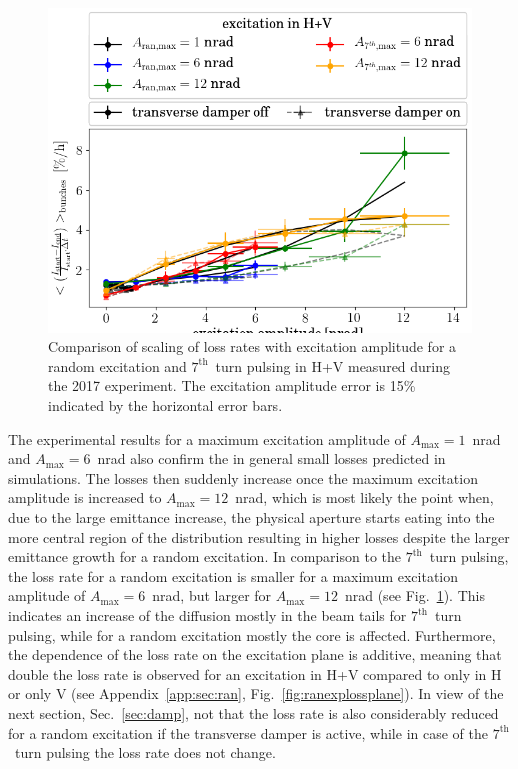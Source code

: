 \documentclass[%
 reprint,
 amsmath,amssymb,
 aps,
prstab,
]{revtex4-1}
\begin{document}
\begin{figure}[b]
	\centering
	\includegraphics[width=0.8\linewidth]{2017_scale_amp_ranhv_lbllong.png}
	\caption{\label{fig:ranexploss}  Comparison of scaling of loss rates with excitation amplitude for a random excitation and $7^{\mathrm{th}}$~turn pulsing in H+V measured during the 2017 experiment. The excitation amplitude error is 15\% indicated by the horizontal error bars.}
\end{figure}
The experimental results for a maximum excitation amplitude of $A_{\mathrm{max}}=1$~nrad and $A_{\mathrm{max}}=6$~nrad also confirm the in general small losses predicted in simulations. The losses then suddenly increase once the maximum excitation amplitude is increased to $A_{\mathrm{max}}=12$~nrad, which is most likely the point when, due to the large emittance increase, the physical aperture starts eating into the more central region of the distribution resulting in higher losses despite the larger emittance growth for a random excitation. In comparison to the $7^{\mathrm{th}}$~turn pulsing, the loss rate for a random excitation is smaller for a maximum excitation amplitude of $A_{\mathrm{max}}=6$~nrad, but larger for $A_{\mathrm{max}}=12$~nrad (see Fig.~\ref{fig:ranexploss}). This indicates an increase of the diffusion mostly in the beam tails for $7^{\mathrm{th}}$~turn pulsing, while for a random excitation mostly the core is affected. Furthermore, the dependence of the loss rate on the excitation plane is additive, meaning that double the loss rate is observed for an excitation in H+V compared to only in H or only V (see Appendix~\ref{app:sec:ran}, Fig.~\ref{fig:ranexplossplane}). In view of the next section, Sec.~\ref{sec:damp}, not that the loss rate is also considerably reduced for a random excitation if the transverse damper is active, while in case of the $7^{\mathrm{th}}$~turn pulsing the loss rate does not change.
\end{document}
